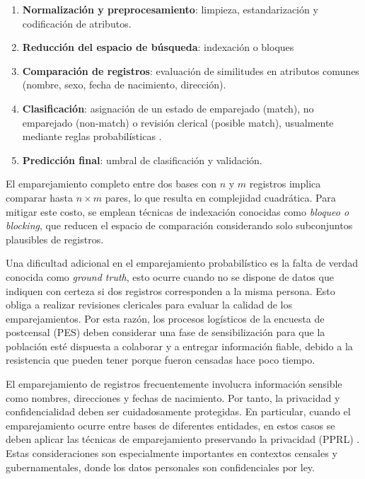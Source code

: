 \documentclass[
  12pt,
]{book}
\providecommand{\tightlist}{%
  \setlength{\itemsep}{0pt}\setlength{\parskip}{0pt}}
\begin{document}
\begin{enumerate}
\def\labelenumi{\arabic{enumi}.}
\tightlist
\item
  \textbf{Normalización y preprocesamiento}: limpieza, estandarización y codificación de atributos.
\item
  \textbf{Reducción del espacio de búsqueda}: indexación o bloques
\item
  \textbf{Comparación de registros}: evaluación de similitudes en atributos comunes (nombre, sexo, fecha de nacimiento, dirección).
\item
  \textbf{Clasificación}: asignación de un estado de emparejado (match), no emparejado (non-match) o revisión clerical (posible match), usualmente mediante reglas probabilísticas \citep{fellegi1969theory}.
\item
  \textbf{Predicción final}: umbral de clasificación y validación.
\end{enumerate}

El emparejamiento completo entre dos bases con \(n\) y \(m\) registros implica comparar hasta \(n \times m\) pares, lo que resulta en complejidad cuadrática. Para mitigar este costo, se emplean técnicas de indexación conocidas como \emph{bloqueo o blocking}, que reducen el espacio de comparación considerando solo subconjuntos plausibles de registros.

Una dificultad adicional en el emparejamiento probabilístico es la falta de verdad conocida como \emph{ground truth}, esto ocurre cuando no se dispone de datos que indiquen con certeza si dos registros corresponden a la misma persona. Esto obliga a realizar revisiones clericales para evaluar la calidad de los emparejamientos. Por esta razón, los procesos logísticos de la encuesta de postcensal (PES) deben considerar una fase de sensibilización para que la población esté dispuesta a colaborar y a entregar información fiable, debido a la resistencia que pueden tener porque fueron censadas hace poco tiempo.

El emparejamiento de registros frecuentemente involucra información sensible como nombres, direcciones y fechas de nacimiento. Por tanto, la privacidad y confidencialidad deben ser cuidadosamente protegidas. En particular, cuando el emparejamiento ocurre entre bases de diferentes entidades, en estos casos se deben aplicar las técnicas de emparejamiento preservando la privacidad (PPRL) \citep{christen2023privacy, Vatsalan2020}. Estas consideraciones son especialmente importantes en contextos censales y gubernamentales, donde los datos personales son confidenciales por ley.
\end{document}
